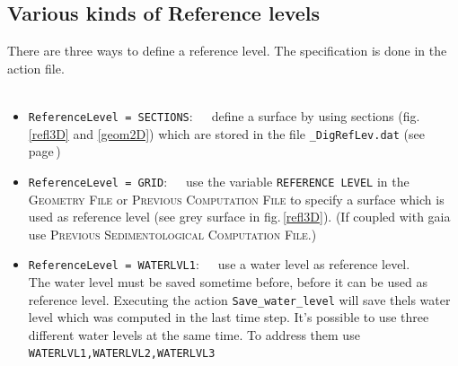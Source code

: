 \newpage
\subsection{Various kinds of Reference levels}\label{ssec:E4RefLev}
\label{txt:Reflevel}
%
There are three ways to define a reference level.
The specification is done in the action file.\\
\\

\begin{itemize}
  \itemsep20pt
  \item \texttt{ReferenceLevel = SECTIONS}:~~~define a surface by using sections
        (fig.\,\ref{refl3D} and \ref{geom2D}) which are stored in the file \texttt{\_DigRefLev.dat}
        (see page\,\pageref{txt:sectionFile})\\
  \item \texttt{ReferenceLevel = GRID}:~~~use the variable \texttt{REFERENCE LEVEL} in the \textsc{Geometry File}
        or \textsc{Previous Computation File} to specify a surface
        which is used as reference level (see grey surface in fig.\,\ref{refl3D}).
        (If coupled with gaia use \textsc{Previous Sedimentological Computation File}.)
  \item \texttt{ReferenceLevel = WATERLVL1}:~~~use a water level as reference level.
        \\The water level must be saved sometime before, before it can be used as reference level.
        Executing the action \texttt{Save\_water\_level} will save thels water level
        which was computed in the last time step. It's possible to use three different
        water levels at the same time. To address them use \texttt{WATERLVL1,WATERLVL2,WATERLVL3}
\end{itemize}

